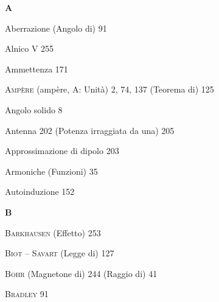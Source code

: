 \renewcommand{\indexname}{INDICE ANALITICO}
\begin{theindex}

  \item \textbf{A}
  \indexspace
  \item Aberrazione (Angolo di) 91
  \item Alnico V 255
  \item Ammettenza 171
  \item \textsc{Amp\`ere} (amp\`ere, A: Unit\`a) 2, 74, 137
    \subitem (Teorema di) 125
  \item Angolo solido 8
  \item Antenna 202
    \subitem (Potenza irraggiata da una) 205
  \item Approssimazione di dipolo 203
  \item Armoniche (Funzioni) 35
  \item Autoinduzione 152

  \indexspace
  \item \textbf{B}
  \indexspace
  \item \textsc{Barkhausen} (Effetto) 253
  \item \textsc{Biot} -- \textsc{Savart} (Legge di) 127
  \item \textsc{Bohr} (Magnetone di) 244
    \subitem (Raggio di) 41
  \item \textsc{Bradley} 91


\end{theindex}

